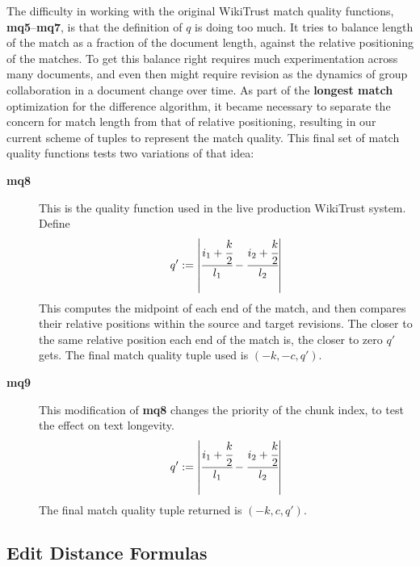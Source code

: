 The difficulty in working with the original WikiTrust
match quality functions, \textbf{mq5}--\textbf{mq7},
is that the definition of $q$ is doing too much.
It tries to balance length of the match as a fraction
of the document length, against the relative positioning
of the matches.
To get this balance right requires much experimentation across
many documents, and even then might require revision as
the dynamics of group collaboration in a document change over time.
As part of the \textbf{longest match} optimization for the
difference algorithm, it became necessary to separate the
concern for match length from that of relative positioning,
resulting in our current scheme of tuples to represent
the match quality.
This final set of match quality functions tests two variations
of that idea:
%
\begin{description}

\item[\textbf{mq8}] This is the quality function used in the
    live production WikiTrust system.
    Define
    \begin{equation*}
    q' := \left|\cfrac{ i_1 + \cfrac{k}{2} }{l_1}
            - \cfrac{ i_2 + \cfrac{k}{2} }{l_2} \right|
    \end{equation*}
    This computes the midpoint of each end of the match,
    and then compares their relative positions within
    the source and target revisions.
    The closer to the same relative position each end of
    the match is, the closer to zero $q'$ gets.
    The final match quality tuple used is $(-k, -c, q')$.

\item[\textbf{mq9}] This modification of \textbf{mq8}
    changes the priority of the chunk index, to test
    the effect on text longevity.
    \begin{equation*}
    q' := \left|\cfrac{ i_1 + \cfrac{k}{2} }{l_1}
            - \cfrac{ i_2 + \cfrac{k}{2} }{l_2} \right|
    \end{equation*}
    The final match quality tuple returned is $(-k, c, q')$.

\end{description}

\subsection{Edit Distance Formulas}

